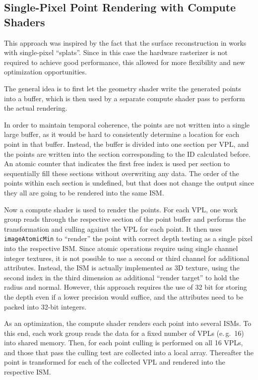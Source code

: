  \subsection{Single-Pixel Point Rendering with Compute Shaders}

 This approach was inspired by the fact that the surface reconstruction in \cite{Marroquim:2007:reconstruction} works with single-pixel ``splats''. Since in this case the hardware rasterizer is not required to achieve good performance, this allowed for more flexibility and new optimization opportunities.

 The general idea is to first let the geometry shader write the generated points into a buffer, which is then used by a separate compute shader pass to perform the actual rendering.

 In order to maintain temporal coherence, the points are not written into a single large buffer, as it would be hard to consistently determine a location for each point in that buffer. Instead, the buffer is divided into one section per VPL, and the points are written into the section corresponding to the ID calculated before. An atomic counter that indicates the first free index is used per section to sequentially fill these sections without overwriting any data. The order of the points within each section is undefined, but that does not change the output since they all are going to be rendered into the same ISM.

 Now a compute shader is used to render the points. For each VPL, one work group reads through the respective section of the point buffer and performs the transformation and culling against the VPL for each point. It then uses \texttt{imageAtomicMin} to ``render'' the point with correct depth testing as a single pixel into the respective ISM. Since atomic operations require using single channel integer textures, it is not possible to use a second or third channel for additional attributes. Instead, the ISM is actually implemented as 3D texture, using the second index in the third dimension as additional ``render target'' to hold the radius and normal. However, this approach requires the use of 32 bit for storing the depth even if a lower precision would suffice, and the attributes need to be packed into 32-bit integers.

 As an optimization, the compute shader renders each point into several ISMs. To this end, each work group reads the data for a fixed number of VPLs (e.\,g.\ 16) into shared memory. Then, for each point culling is performed on all 16 VPLs, and those that pass the culling test are collected into a local array. Thereafter the point is transformed for each of the collected VPL and rendered into the respective ISM.

